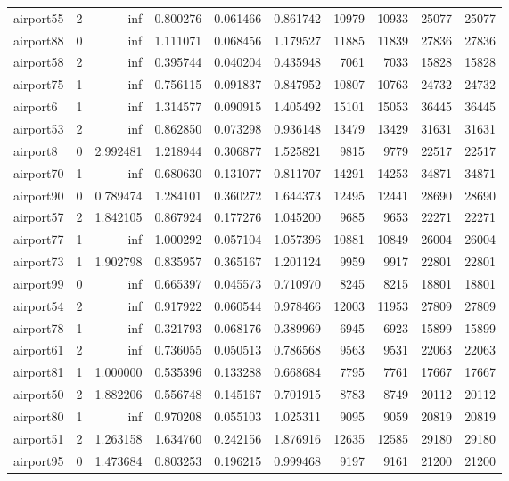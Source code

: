 \begin{longtable}{|l|r|r|r|r|r|r|r|r|r|}
airport55 & 2 & inf & 0.800276 & 0.061466 & 0.861742 & 10979 & 10933 & 25077 & 25077 \\
airport88 & 0 & inf & 1.111071 & 0.068456 & 1.179527 & 11885 & 11839 & 27836 & 27836 \\
airport58 & 2 & inf & 0.395744 & 0.040204 & 0.435948 & 7061 & 7033 & 15828 & 15828 \\
airport75 & 1 & inf & 0.756115 & 0.091837 & 0.847952 & 10807 & 10763 & 24732 & 24732 \\
airport6 & 1 & inf & 1.314577 & 0.090915 & 1.405492 & 15101 & 15053 & 36445 & 36445 \\
airport53 & 2 & inf & 0.862850 & 0.073298 & 0.936148 & 13479 & 13429 & 31631 & 31631 \\
airport8 & 0 & 2.992481 & 1.218944 & 0.306877 & 1.525821 & 9815 & 9779 & 22517 & 22517 \\
airport70 & 1 & inf & 0.680630 & 0.131077 & 0.811707 & 14291 & 14253 & 34871 & 34871 \\
airport90 & 0 & 0.789474 & 1.284101 & 0.360272 & 1.644373 & 12495 & 12441 & 28690 & 28690 \\
airport57 & 2 & 1.842105 & 0.867924 & 0.177276 & 1.045200 & 9685 & 9653 & 22271 & 22271 \\
airport77 & 1 & inf & 1.000292 & 0.057104 & 1.057396 & 10881 & 10849 & 26004 & 26004 \\
airport73 & 1 & 1.902798 & 0.835957 & 0.365167 & 1.201124 & 9959 & 9917 & 22801 & 22801 \\
airport99 & 0 & inf & 0.665397 & 0.045573 & 0.710970 & 8245 & 8215 & 18801 & 18801 \\
airport54 & 2 & inf & 0.917922 & 0.060544 & 0.978466 & 12003 & 11953 & 27809 & 27809 \\
airport78 & 1 & inf & 0.321793 & 0.068176 & 0.389969 & 6945 & 6923 & 15899 & 15899 \\
airport61 & 2 & inf & 0.736055 & 0.050513 & 0.786568 & 9563 & 9531 & 22063 & 22063 \\
airport81 & 1 & 1.000000 & 0.535396 & 0.133288 & 0.668684 & 7795 & 7761 & 17667 & 17667 \\
airport50 & 2 & 1.882206 & 0.556748 & 0.145167 & 0.701915 & 8783 & 8749 & 20112 & 20112 \\
airport80 & 1 & inf & 0.970208 & 0.055103 & 1.025311 & 9095 & 9059 & 20819 & 20819 \\
airport51 & 2 & 1.263158 & 1.634760 & 0.242156 & 1.876916 & 12635 & 12585 & 29180 & 29180 \\
airport95 & 0 & 1.473684 & 0.803253 & 0.196215 & 0.999468 & 9197 & 9161 & 21200 & 21200 \\

\end{longtable}
